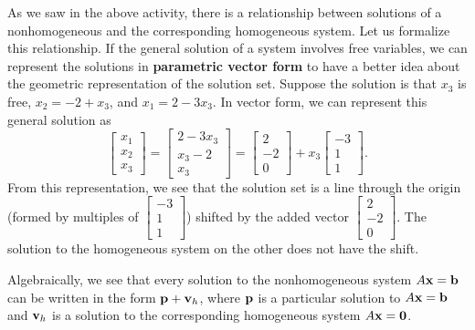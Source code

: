 As we saw in the above activity, there is a relationship between solutions of a nonhomogeneous and the corresponding homogeneous system. Let us formalize this relationship. If the general solution of a system involves free variables, we can represent the solutions in \textbf{parametric vector form} to have a better idea about the geometric representation of the solution set. Suppose the solution is that $x_3$ is free, $x_2 = -2+x_3$, and $x_1 = 2-3x_3$. In vector form, we can represent this general solution as
\begin{equation} 
\left[ \begin{array}{c} x_1 \\ x_2 \\ x_3 \end{array} \right] = \left[ \begin{array}{c} 2-3x_3 \\ x_3-2 \\ x_3 \end{array} \right] = \left[ \begin{array}{r} 2 \\ -2 \\ 0 \end{array} \right] + x_3\left[ \begin{array}{r} -3 \\ 1 \\ 1 \end{array} \right].
\end{equation}
From this representation, we see that the solution set is a line through the origin (formed by multiples of $\left[ \begin{array}{r} -3 \\ 1 \\ 1 \end{array} \right]$) shifted by the added vector $\left[ \begin{array}{r} 2 \\ -2 \\ 0 \end{array} \right]$. The solution to the homogeneous system on the other does not have the shift.

\vspace{0.2cm}

Algebraically, we see that every solution to the nonhomogeneous system $A\mathbf{x} = \mathbf{b}$ can be written in the form $\mathbf{p} + \mathbf{v}_h$, where $\mathbf{p}$ is a particular solution to $A\mathbf{x} = \mathbf{b}$ and $\mathbf{v}_h$ is a solution to the corresponding homogeneous system $A\mathbf{x} = \mathbf{0}$. 

